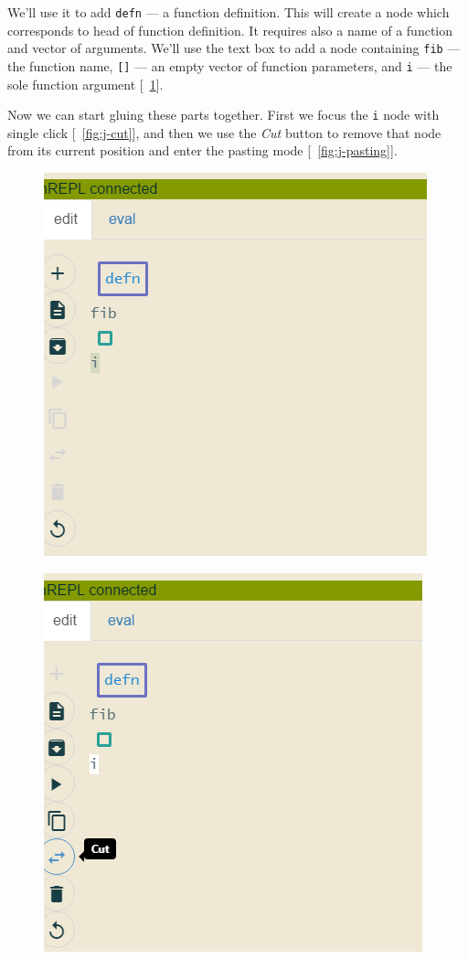 \documentclass[english,mgr,shortabstract]{iithesis}
\newcommand*{\figref}[1]{[\textbf{\figurename}~\ref{#1}]}
\begin{document}
We'll use it to add \lstinline|defn| --- a function definition. This will create a
node which corresponds to head of function definition. It requires also a name of
a function and vector of arguments. We'll use the text box to add a node containing
\lstinline|fib| --- the function name, \lstinline|[]| --- an empty vector of function
parameters, and \lstinline|i| --- the sole function argument \figref{fig:j-fib_parts}.

Now we can start gluing these parts together. First we focus the \lstinline|i| node
with single click \figref{fig:j-cut}, and then we use the \textit{Cut} button to
remove that node from its current
position and enter the pasting mode \figref{fig:j-pasting}.

\begin{figure}[hbt]
  \centering
  \begin{minipage}{0.48\textwidth}
    \centering
    \includegraphics[scale=0.3]{img/j-fib_parts}
\label{fig:j-fib_parts}
  \end{minipage}
  \begin{minipage}{0.48\textwidth}
    \centering
    \includegraphics[scale=0.3]{img/j-cut}

\end{minipage}
\end{figure}
\end{document}
